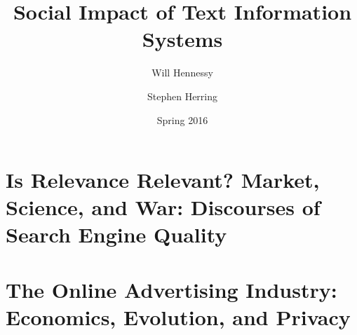 \documentclass[11pt]{article}
\title{Social Impact of Text Information Systems}
\author{Will Hennessy \and Stephen Herring}
\date{Spring 2016}
\begin{document}
\maketitle


\newpage

%

\section{Is Relevance Relevant? Market, Science, and War:  Discourses of Search Engine Quality}

\newpage

%

\section{The Online Advertising Industry: Economics, Evolution, and Privacy}

\newpage

%

%

%

%

%

%
\end{document}
